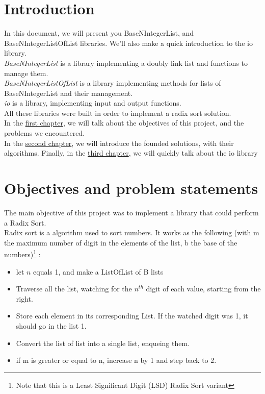 \documentclass[book, backcover, english, nodocumentinfo]{upmethodology-document}
\begin{document}
\chapter*{Introduction}
In this document, we will present you BaseNIntegerList, and BaseNIntegerListOfList libraries. We'll also make a quick introduction to the io library.\\
\qquad \textit{BaseNIntegerList} is a library implementing a doubly link list and functions to manage them.\\
\qquad \textit{BaseNIntegerListOfList} is a library implementing methods for lists of BaseNIntegerList and their management.\\
\qquad \textit{io} is a library, implementing input and output functions.\\

All these libraries were built in order to implement a radix sort solution.\\

In the \hyperref[chapter:Objectives]{first chapter}, we will talk about the objectives of this project, and the problems we encountered.\\
In the \hyperref[chapter:Algorithms]{second chapter}, we will introduce the founded solutions, with their algorithms.
Finally, in the \hyperref[chapter:IO-Lib]{third chapter}, we will quickly talk about  the io library

\tableofcontents{}

\chapter{Objectives and problem statements} \label{chapter:Objectives}
The main objective of this project was to implement a library that could perform a Radix Sort.\\
Radix sort is a algorithm used to sort numbers. It works as the following (with m the maximum number of digit in the elements of the list, b the base of the numbers)\footnote{Note that this is a Least Significant Digit (LSD) Radix Sort variant} :\\
\begin{itemize}
	\item[1]{} let \(n\) equals 1, and make a ListOfList of B lists
	\item[2]{} Traverse all the list, watching for the \(n^{th}\) digit of each value, starting from the right.
	\item[3]{} Store each element in its corresponding List. If the watched digit was 1, it should go in the  list 1.
	\item[4]{} Convert the list of list into a single list, enqueing them.
	\item[5]{} if m is greater or equal to n, increase n by 1 and step back to 2.
\end{itemize}
\end{document}
